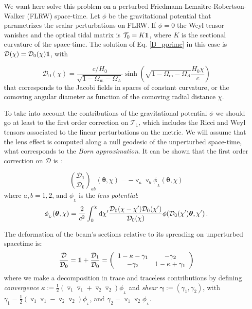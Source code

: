 \documentclass[twocolumn,aps,reprint, nofootinbib]{revtex4}
\newcommand{\Omegam}{{\Omega_\mathrm{m}}}
\newcommand{\Omegal}{{\Omega_\Lambda}}
\newcommand{\dd}{{\rm d}}
\newcommand{\bfth}{{\boldsymbol{\theta}}}
\newcommand{\mD}{{\mathcal{D}_0}}
\begin{document}
We want here solve this problem on a perturbed  Friedmann-Lemaitre-Robertson-Walker (FLRW) space-time. Let $\phi$ be the gravitational potential that parametrizes the scalar perturbations on FLRW. If $\phi=0$ the Weyl tensor vanishes and the optical tidal matrix is $\mathcal{T}_0 = K \bold{1}$, where $K$ is the sectional curvature of the space-time. The solution of Eq. \eqref{D_pprime} in this case is $\mathcal{D}(\chi) = \mD(\chi) \bold{1}$, with

\begin{equation}
\label{ang_dist}
\mD(\chi)  = \frac{c/H_0}{\sqrt{1 - \Omegam - \Omegal}} \sinh \left( \sqrt{1 - \Omegam - \Omegal} \frac{H_0 \chi}{c} \right)
\end{equation}
that corresponds to the Jacobi fields in spaces of constant curvature, or the comoving angular diameter as function of the comoving radial distance $\chi$.

To take into account the contributions of the gravitational potential $\phi$ we should go at least to the first order correction on $\mathcal{T}_1$, which includes the Ricci and Weyl tensors associated to the linear perturbations on the metric. We will assume that the lens effect is computed along a null geodesic of the unperturbed space-time, what corresponds to the \emph{Born approximation}.  It can be shown that the first order correction on $\mathcal{D}$ is \cite{bartelmann2010gravitational, peter2013primordial}:


\begin{equation}
\label{D^1/D^0}
\left( \frac{\mathcal{D}_1}{ \mD}\right)_{ab} (\bfth, \chi)  =  - \triangledown_a \triangledown_b \phi_{_L} (\bfth, \chi) 
\end{equation}
where $a, b =1, 2$, and $\phi_{_L}$ is the \emph{lens potential}:
\begin{equation}
\phi_{_L} (\bfth,\chi)  = \frac{2}{c^2} \int_0^{\chi} \dd \chi' \frac{\mD(\chi - \chi')\mD(\chi')}{ \mD(\chi)} \phi (\mD(\chi') \bfth, \chi')  \, .
\end{equation}

The deformation of the beam's sections relative to its spreading on unperturbed spacetime is:
\begin{equation}
\label{deformation}
\frac{\mathcal{D}}{ \mD} = \bold{1} + \frac{\mathcal{D}_1}{ \mD} = \left( \begin{array}{cc} 1 - \kappa - \gamma_1 & -\gamma_2\\ -\gamma_2 & 1 - \kappa + \gamma_1 \end{array} \right)
\end{equation}
where we make a decomposition in trace and traceless contributions by defining \emph{convergence} $\kappa := \frac{1}{2} ( \triangledown_1 \triangledown_1 + \triangledown_2 \triangledown_2) \phi_{_L}$ and \emph{shear} $\boldsymbol{\gamma} := (\gamma_1, \gamma_2)$, with $\gamma_1 = \frac{1}{2} ( \triangledown_1 \triangledown_1 - \triangledown_2 \triangledown_2) \phi_{_L}$, and $\gamma_2 = \triangledown_1 \triangledown_2 \phi_{_L}$.
\end{document}
